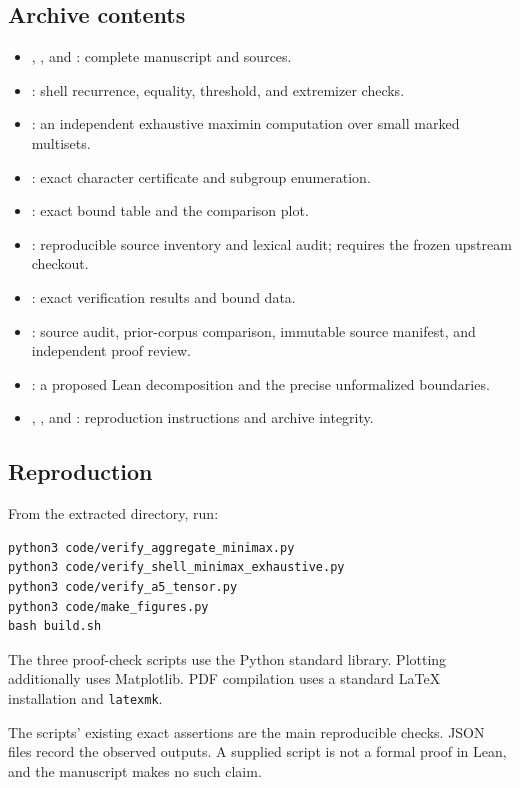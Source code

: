 \subsection{Archive contents}
\begin{itemize}
\item {}, , and : complete manuscript and sources.
\item {}: shell recurrence, equality, threshold, and extremizer checks.
\item {}: an independent exhaustive maximin computation over small marked multisets.
\item {}: exact character certificate and subgroup enumeration.
\item {}: exact bound table and the comparison plot.
\item {}: reproducible source inventory and lexical audit; requires the frozen upstream checkout.
\item {}: exact verification results and bound data.
\item {}: source audit, prior-corpus comparison, immutable source manifest, and independent proof review.
\item {}: a proposed Lean decomposition and the precise unformalized boundaries.
\item {}, , and : reproduction instructions and archive integrity.
\end{itemize}

\subsection{Reproduction}
From the extracted directory, run:
\begin{lstlisting}
python3 code/verify_aggregate_minimax.py
python3 code/verify_shell_minimax_exhaustive.py
python3 code/verify_a5_tensor.py
python3 code/make_figures.py
bash build.sh
\end{lstlisting}
The three proof-check scripts use the Python standard library. Plotting additionally uses Matplotlib. PDF compilation uses a standard LaTeX installation and \texttt{latexmk}.

The scripts' existing exact assertions are the main reproducible checks. JSON files record the observed outputs. A supplied script is not a formal proof in Lean, and the manuscript makes no such claim.

